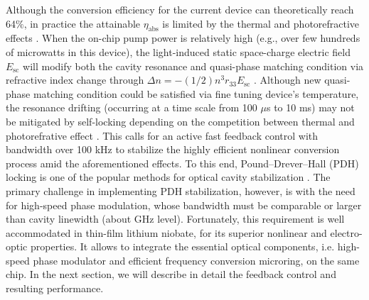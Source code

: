 \documentclass{WileyMSP-template}
\begin{document}
Although the conversion efficiency for the current device can theoretically reach 64$\%$, in practice the attainable $\eta_\mathrm{abs}$ is limited by the thermal and photorefractive effects \cite{Surya:21}. When the on-chip pump power is relatively high (e.g., over few hundreds of microwatts in this device), the light-induced static space-charge electric field $E_\mathrm{sc}$ will modify both the cavity resonance and quasi-phase matching condition via refractive index change through $\Delta n = -(1/2)n^3r_{33}E_\mathrm{sc}$ \cite{sun2017nonlinear}. Although new quasi-phase matching condition could be satisfied via fine tuning device's temperature, the resonance drifting (occurring at a time scale from 100 $\mu$s to 10 ms) may not be mitigated by self-locking depending on the competition between thermal and photorefrative effect \cite{he2019self}. This calls for an active fast feedback control with bandwidth over 100 kHz to stabilize the highly efficient nonlinear conversion process amid the aforementioned effects. To this end, Pound–Drever–Hall (PDH) locking is one of the popular methods for optical cavity stabilization \cite{black2001introduction}. The primary challenge in implementing PDH stabilization, however, is with the need for high-speed phase modulation, whose bandwidth must be comparable or larger than cavity linewidth (about GHz level). Fortunately, this requirement is well accommodated in thin-film lithium niobate, for its superior nonlinear and electro-optic properties. It allows to integrate the essential optical components, i.e. high-speed phase modulator and efficient frequency conversion microring, on the same chip. In the next section, we will describe in detail the feedback control and resulting performance. 
\end{document}
